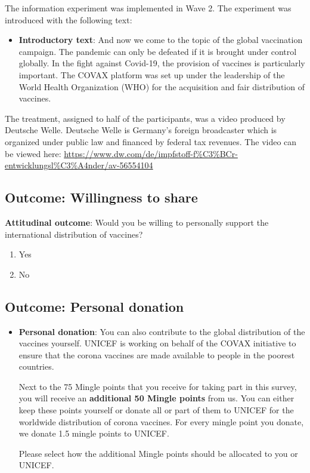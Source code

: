\documentclass[]{article}
\begin{document}
The information experiment was implemented in Wave 2. The experiment was introduced with the following text:

\begin{itemize}
	\item
	\textbf{Introductory text}: And now we come to the topic of the global
	vaccination campaign. The pandemic can only be defeated if it is
	brought under control globally. In the fight against Covid-19, the
	provision of vaccines is particularly important. The COVAX platform
	was set up under the leadership of the World Health Organization (WHO)
	for the acquisition and fair distribution of vaccines.
\end{itemize}

The treatment, assigned to half of the participants, was a video produced by Deutsche Welle. Deutsche Welle is Germany's foreign broadcaster which is organized under public law and financed by federal tax revenues. The video can be viewed here: 
\url{https://www.dw.com/de/impfstoff-f\%C3\%BCr-entwicklungsl\%C3\%A4nder/av-56554104}

\subsection{Outcome: Willingness to share}

\textbf{Attitudinal outcome}: Would you be willing to personally support the international distribution of vaccines?
\begin{enumerate}
	\item Yes
	\item No 
\end{enumerate}

\hypertarget{outcome-personal-donation}{%
	\subsection{Outcome: Personal
		donation}\label{outcome-personal-donation}}

\begin{itemize}
	\item
	\textbf{Personal donation}: You can also contribute to the global
	distribution of the vaccines yourself. UNICEF is working on behalf of
	the COVAX initiative to ensure that the corona vaccines are made
	available to people in the poorest countries.
	
	Next to the 75 Mingle points that you receive for taking part in this
	survey, you will receive an \textbf{additional 50 Mingle points} from
	us. You can either keep these points yourself or donate all or part of
	them to UNICEF for the worldwide distribution of corona vaccines. For
	every mingle point you donate, we donate 1.5 mingle points to UNICEF.
	
	Please select how the additional Mingle points should be allocated to
	you or UNICEF.
\end{itemize}
\end{document}
